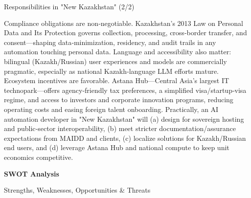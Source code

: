 \documentclass[aspectratio=169,14pt]{beamer}
\begin{document}
\begin{frame}{Responsibilities in "New Kazakhstan" (2/2)}
  \hspace{1.5cm}%
  \begin{minipage}{0.8\textwidth}
    Compliance obligations are non‑negotiable. Kazakhstan's 2013 Law on Personal Data and Its Protection governs collection, processing, cross‑border transfer, and consent—shaping data‑minimization, residency, and audit trails in any automation touching personal data. Language and accessibility also matter: bilingual (Kazakh/Russian) user experiences and models are commercially pragmatic, especially as national Kazakh‑language LLM efforts mature. Ecosystem incentives are favorable. Astana Hub—Central Asia's largest IT technopark—offers agency‑friendly tax preferences, a simplified visa/startup‑visa regime, and access to investors and corporate innovation programs, reducing operating costs and easing foreign talent onboarding. Practically, an AI automation developer in "New Kazakhstan" will (a) design for sovereign hosting and public‑sector interoperability, (b) meet stricter documentation/assurance expectations from MAIDD and clients, (c) localize solutions for Kazakh/Russian end users, and (d) leverage Astana Hub and national compute to keep unit economics competitive.
  \end{minipage}
\end{frame}

\begin{frame}[plain]
  \vfill
  \hspace{1.5cm}%
  \begin{minipage}{0.8\textwidth}
    {\fontsize{48}{58}\selectfont\bfseries\color{Dark}SWOT Analysis}

    \vspace{0.5cm}

    {\fontsize{18}{24}\selectfont\color{Grey}Strengths, Weaknesses, Opportunities \& Threats}
  \end{minipage}
  \vfill
  \vfill
\end{frame}
\end{document}
